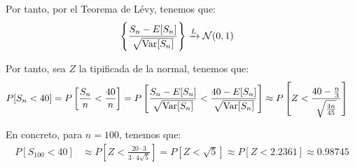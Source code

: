\begin{ejercicio}
    Por tanto, por el Teorema de Lévy, tenemos que:
    \begin{align*}
        \left\{\frac{S_{n}-E[S_n]}{\sqrt{\operatorname{Var}[S_{n}]}}\right\} &\xrightarrow{L} \mathcal{N}(0,1)
    \end{align*}

    Por tanto, sea $Z$ la tipificada de la normal, tenemos que:
    \begin{align*}
        P[S_{n} < 40] &= P\left[\frac{S_{n}}{n} < \frac{40}{n}\right]
        = P\left[\frac{S_{n}-E[S_n]}{\sqrt{\operatorname{Var}[S_{n}]}} < \frac{40 - E[S_n]}{\sqrt{\operatorname{Var}[S_{n}]}}\right]
        \approx P\left[Z < \frac{40 - \frac{n}{3}}{\sqrt{\frac{4n}{45}}}\right]
    \end{align*}

    En concreto, para $n=100$, tenemos que:
    \begin{align*}
        P[S_{100} < 40] &\approx P\left[Z < \frac{20\cdot 3}{3\cdot 4\sqrt{5}}\right]
        = P\left[Z < \sqrt{5}\right]
        \approx P\left[Z < 2.2361\right]
        \approx 0.98745
    \end{align*}
\end{ejercicio}


